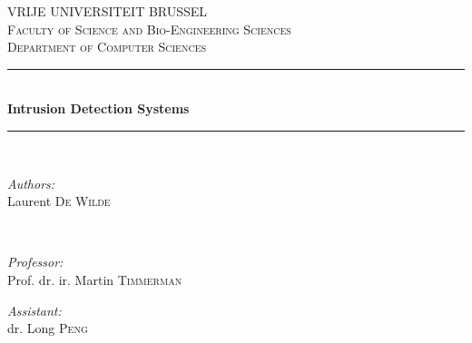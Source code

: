 \documentclass[11pt, a4paper,svgnames]{report}
\begin{document}
\begin{titlepage}

\newcommand{\HRule}{\rule{\linewidth}{0.5mm}}

\center


\textsc{\LARGE VRIJE UNIVERSITEIT BRUSSEL}\\[1.5cm] 
\textsc{\Large Faculty of Science and Bio-Engineering Sciences}\\[0.5cm] 
\textsc{\large Department of Computer Sciences}\\[0.5cm] 


\HRule \\[0.7cm]
{ \huge \bfseries  Intrusion Detection Systems}\\[0.4cm] 
\HRule \\[1.5cm]
 

\begin{minipage}{0.4\textwidth}
\begin{flushleft} \large
\emph{Authors:}\\
Laurent \textsc{De Wilde} \\
\end{flushleft}
\end{minipage}
~
\begin{minipage}{0.4\textwidth}
\begin{flushright} \large
\emph{Professor:} \\
Prof. dr. ir. Martin \textsc{Timmerman}

\emph{Assistant:} \\
dr. Long \textsc{Peng}
\end{flushright}
\end{minipage}\\[4cm]



\end{titlepage}
\end{document}
